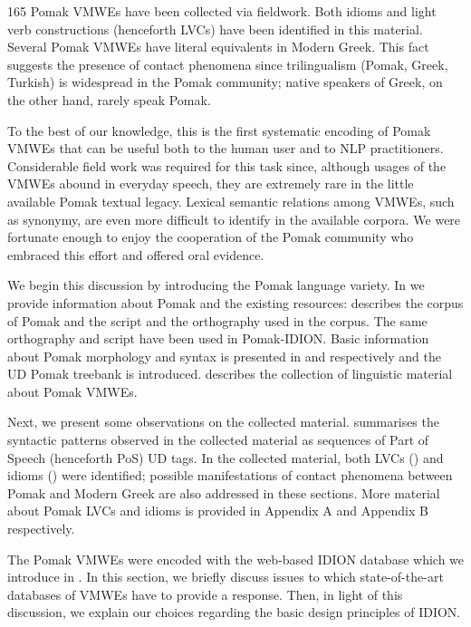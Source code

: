 \documentclass[output=paper,colorlinks,citecolor=brown]{langscibook}
\begin{document}
165 Pomak VMWEs have been collected via fieldwork. Both idioms and light verb constructions (henceforth LVCs) have been identified in this material.  Several Pomak VMWEs have literal equivalents in Modern Greek. This fact suggests the presence of contact phenomena since trilingualism (Pomak, Greek, Turkish) is widespread in the Pomak community; native speakers of Greek, on the other hand, rarely speak Pomak.  


To the best of our knowledge, this is the first systematic encoding of Pomak VMWEs that can be useful both to the human user and to NLP practitioners. Considerable field work was required for this task since, although usages of the VMWEs abound in everyday speech, they are extremely rare in the little available Pomak textual legacy. Lexical semantic relations among VMWEs, such as synonymy,  are even more difficult to identify in the available corpora. We were fortunate enough to enjoy the cooperation of the Pomak community who embraced this effort and offered oral evidence.

We begin this discussion by introducing the Pomak language variety. In  we provide information about Pomak and the existing resources:  describes the corpus of Pomak and  the script and the orthography used in the corpus. The same orthography and script have been used in Pomak-IDION. Basic information about Pomak morphology and syntax is presented in  
and  respectively and the UD Pomak treebank is introduced.   describes the collection of linguistic material about Pomak VMWEs. 

Next, we present some observations on the collected material.  summarises the syntactic patterns observed in the collected material as sequences of Part of Speech (henceforth PoS) UD tags. In the collected material, both  LVCs () and idioms () were identified; possible manifestations of contact phenomena between Pomak and Modern Greek are also addressed in these sections.  More material about Pomak LVCs and idioms is provided in Appendix A and Appendix B respectively. 
 
The  Pomak VMWEs were encoded with the web-based IDION database which we introduce in  . In this section, we briefly discuss issues to which state-of-the-art  databases of VMWEs have to provide a response. Then,  in light of this discussion,  we explain our choices regarding the basic design principles of IDION.
\end{document}
